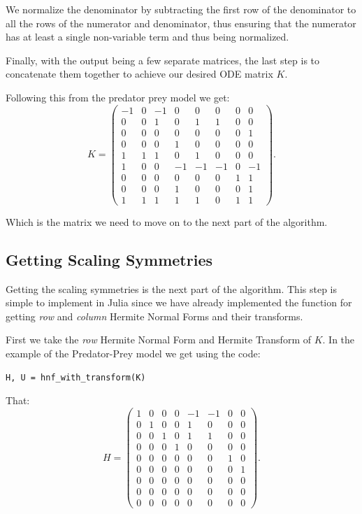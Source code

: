 \documentclass[oneside, a4paper, onecolumn, 11pt]{article}
\begin{document}
We normalize the denominator by subtracting the first row of the denominator to all the rows of the numerator and denominator, thus ensuring that the numerator has at least a single non-variable term and thus being normalized.

Finally, with the output being a few separate matrices, the last step is to concatenate them together to achieve our desired ODE matrix \(K\).

Following this from the predator prey model we get:
\[
    K = \begin{pmatrix}
        -1 & 0 & -1 & 0  & 0  & 0  & 0 & 0  \\
        0  & 0 & 1  & 0  & 1  & 1  & 0 & 0  \\
        0  & 0 & 0  & 0  & 0  & 0  & 0 & 1  \\
        0  & 0 & 0  & 1  & 0  & 0  & 0 & 0  \\
        1  & 1 & 1  & 0  & 1  & 0  & 0 & 0  \\
        1  & 0 & 0  & -1 & -1 & -1 & 0 & -1 \\
        0  & 0 & 0  & 0  & 0  & 0  & 1 & 1  \\
        0  & 0 & 0  & 1  & 0  & 0  & 0 & 1  \\
        1  & 1 & 1  & 1  & 1  & 0  & 1 & 1
    \end{pmatrix}.
\]

Which is the matrix we need to move on to the next part of the algorithm.

\subsection{Getting Scaling Symmetries}

Getting the scaling symmetries is the next part of the algorithm. This step is simple to implement in Julia since we have already implemented the function for getting \textit{row} and \textit{column} Hermite Normal Forms and their transforms.

First we take the \textit{row} Hermite Normal Form and Hermite Transform of \(K\). In the example of the Predator-Prey model we get using the code:
\begin{lstlisting}
H, U = hnf_with_transform(K)
\end{lstlisting}

That:
\[
    H = \begin{pmatrix}
        1 & 0 & 0 & 0 & -1 & -1 & 0 & 0 \\
        0 & 1 & 0 & 0 & 1  & 0  & 0 & 0 \\
        0 & 0 & 1 & 0 & 1  & 1  & 0 & 0 \\
        0 & 0 & 0 & 1 & 0  & 0  & 0 & 0 \\
        0 & 0 & 0 & 0 & 0  & 0  & 1 & 0 \\
        0 & 0 & 0 & 0 & 0  & 0  & 0 & 1 \\
        0 & 0 & 0 & 0 & 0  & 0  & 0 & 0 \\
        0 & 0 & 0 & 0 & 0  & 0  & 0 & 0 \\
        0 & 0 & 0 & 0 & 0  & 0  & 0 & 0
    \end{pmatrix}.
\]
\end{document}
